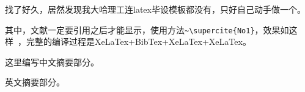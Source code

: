 \cleardoublepage
\begin{cabstract}{\heiti}

	找了好久，居然发现我大哈理工连latex毕设模板都没有，只好自己动手做一个。
	
	其中，文献一定要引用之后才能显示，使用方法\verb|~\supercite{No1}|，效果如这样~\supercite{No1}，完整的编译过程是XeLaTex+BibTex+XeLaTex+XeLaTex。
	
	这里编写中文摘要部分。
	
\end{cabstract}
\cleardoublepage
\begin{eabstract}

	英文摘要部分。
	
\end{eabstract}

